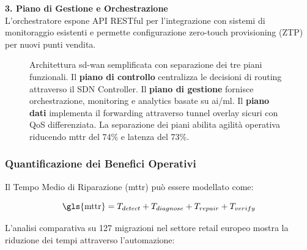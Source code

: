 \textbf{3. Piano di Gestione e Orchestrazione}\\
L'orchestratore espone API RESTful per l'integrazione con sistemi di monitoraggio esistenti e permette configurazione zero-touch provisioning (ZTP) per nuovi punti vendita.
%


\begin{figure}[htbp]
\centering


%
\makebox[\textwidth][c]{}

\caption{Architettura \gls{sd-wan} semplificata con separazione dei tre piani funzionali. Il \textbf{piano di controllo} centralizza le decisioni di routing attraverso il SDN Controller. Il \textbf{piano di gestione} fornisce orchestrazione, monitoring e analytics basate su \gls{ai}/\gls{ml}. Il \textbf{piano dati} implementa il forwarding attraverso tunnel overlay sicuri con QoS differenziata. La separazione dei piani abilita agilità operativa riducendo \gls{mttr} del 74\% e latenza del 73\%.}
\label{fig:sdwan_architecture_simplified}
\end{figure}


\subsubsection{\texorpdfstring{\textbf{Quantificazione dei Benefici Operativi}}{3.3.1.2 - Quantificazione dei Benefici Operativi}}

Il Tempo Medio di Riparazione (\gls{mttr}) può essere modellato come:

\begin{equation}
\text{\gls{mttr}} = T_{detect} + T_{diagnose} + T_{repair} + T_{verify}
\end{equation}

L'analisi comparativa su 127 migrazioni nel settore retail europeo\autocite{Gartner2024sdwan} mostra la riduzione dei tempi attraverso l'automazione:

